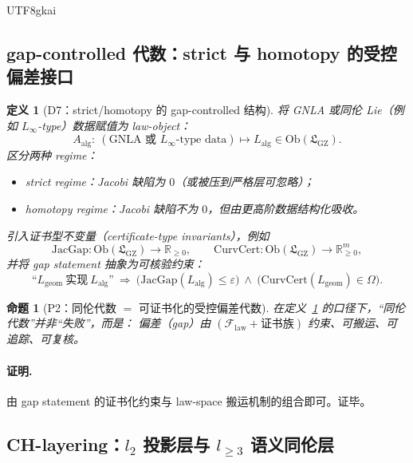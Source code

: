 \documentclass[12pt]{article}
\newtheorem{definition}{定义}[section]
\newtheorem{proposition}{命题}[section]
\begin{document}
\begin{CJK*}{UTF8}{gkai}
\subsection{gap-controlled 代数：strict 与 homotopy 的受控偏差接口}
\label{subsec:tex19-appB-gap-controlled}

\begin{definition}[D7：strict/homotopy 的 gap-controlled 结构]
\label{def:tex19-appB-D7-gap}
将 GNLA 或同伦 Lie（例如 $L_\infty$-type）数据赋值为 law-object：
\[
A_{\mathrm{alg}}:\ (\text{GNLA 或 }L_\infty\text{-type data})\mapsto L_{\mathrm{alg}}\in \mathrm{Ob}(\mathfrak{L}
  _{\mathrm{GZ}}).
\]
区分两种 regime：
\begin{itemize}
  \item strict regime：Jacobi 缺陷为 $0$（或被压到严格层可忽略）；
  \item homotopy regime：Jacobi 缺陷不为 $0$，但由更高阶数据结构化吸收。
\end{itemize}
引入证书型不变量（certificate-type invariants），例如
\[
\mathrm{JacGap}:\mathrm{Ob}(\mathfrak{L}_{\mathrm{GZ}})\to \mathbb{R}_{\ge 0},\qquad
\mathrm{CurvCert}:\mathrm{Ob}(\mathfrak{L}_{\mathrm{GZ}})\to \mathbb{R}_{\ge 0}^m,
\]
并将 gap statement 抽象为可核验约束：
\[
\text{“}L_{\mathrm{geom}}\ \text{实现}\ L_{\mathrm{alg}}\text{”}
\ \Rightarrow\
\bigl(\mathrm{JacGap}(L_{\mathrm{alg}})\le \varepsilon\bigr)\ \wedge\ \bigl(\mathrm{CurvCert}(L_{\mathrm{geom}})\in
  \Omega\bigr).
\]
\end{definition}

\begin{proposition}[P2：同伦代数 $=$ 可证书化的受控偏差代数]
\label{prop:tex19-appB-P2-controlled-deviation}
在定义~\ref{def:tex19-appB-D7-gap} 的口径下，“同伦代数”并非“失败”，而是：
偏差（gap）由 $(\mathcal{F}_{\mathrm{law}}+\text{证书族})$ 约束、可搬运、可追踪、可复核。
\end{proposition}

\paragraph{证明.}
由 gap statement 的证书化约束与 law-space 搬运机制的组合即可。证毕。

\subsection{CH-layering：\texorpdfstring{$l_2$}{l2} 投影层与 \texorpdfstring{$l_{\ge 3}$}{l>=3} 语义同伦层}
\label{subsec:tex19-appB-ch-layering}


\end{CJK*}
\end{document}
